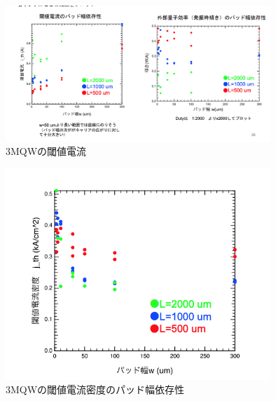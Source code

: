 \begin{figure}[h]
	\centering
	\includegraphics[width=10cm]{figure/fig_3_1_broad_i_th_3QW.png}
		\caption{3MQWの閾値電流}
		\label{fig_3_1_broad_i_th_3QW}
\end{figure}

\begin{figure}[h]
	\centering
	\includegraphics[width=10cm]{figure/fig_3_1_broad_j_th_3QW.png}
		\caption{3MQWの閾値電流密度のパッド幅依存性}
		\label{fig_3_1_broad_j_th_3QW}
\end{figure}

\newpage
